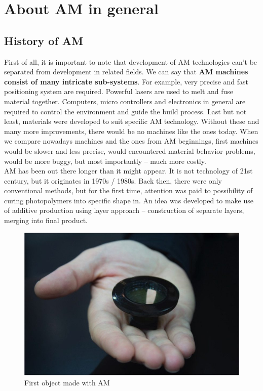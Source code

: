 \documentclass[a4paper, twoside, 11pt]{report}
\begin{document}
\chapter{About AM in general}
%
\section{History of AM}
First of all, it is important to note that development of AM technologies can't be separated from development in related fields. We can say that \textbf{AM machines consist of many intricate sub-systems}. For example, very precise and fast positioning system are required. Powerful lasers are used to melt and fuse material together. Computers, micro controllers and electronics in general are required to control the environment and guide the build process. Last but not least, materials were developed to suit specific AM technology. Without these and many more improvements, there would be no machines like the ones today. When we compare nowadays machines and the ones from AM beginnings, first machines would be slower and less precise, would encountered material behavior problems, would be more buggy, but most importantly – much more costly.\\
AM has been out there longer than it might appear. It is not technology of 21st century, but it originates in 1970s / 1980s. Back then, there were only conventional methods, but for the first time, attention was paid to possibility of curing photopolymers into specific shape in. An idea was developed to make use of additive production using layer approach – construction of separate layers, merging into final product.\cite{AMOrigins}\\
%
\begin{figure}
 	\includegraphics[width=\textwidth/2]{firstPrintedObject}
	\caption{First object made with AM}
\end{figure}
\end{document}
